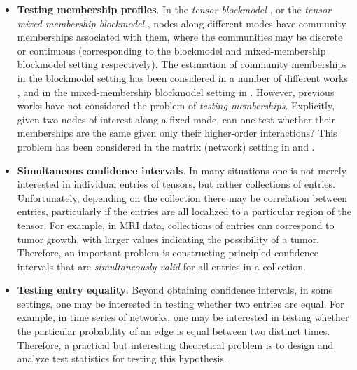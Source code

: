\documentclass[10pt]{article}
\newcommand{\0}{{\mathbf{0}}}
\newcommand{\1}{{\mathbf{1}}}
\renewcommand{\citet}{\cite}
\begin{document}
\begin{itemize}
    \item \textbf{Testing membership profiles}.  In the \emph{tensor blockmodel} \citep{wu_general_2016}, or the \emph{tensor mixed-membership blockmodel} \citep{agterberg_estimating_2022}, nodes along different modes have community memberships associated with them, where the communities may be discrete or continuous (corresponding to the blockmodel and mixed-membership blockmodel setting respectively).   The estimation of community memberships in the blockmodel setting has been considered in a number of different works \citep{han_exact_2020,chi_provable_2020,wang_multiway_2019}, and in the mixed-membership blockmodel setting in \citet{agterberg_estimating_2022}. However, previous works have not considered the problem of \emph{testing memberships}.  Explicitly, given two nodes of interest along a fixed mode, can one test whether their memberships are the same given only their higher-order interactions?  This problem has been considered in the matrix (network) setting in \citet{fan_simple_2022} and \citet{du_hypothesis_2022}. %
\item  \textbf{Simultaneous confidence intervals}. In many situations one is not merely interested in individual entries of tensors, but rather collections of entries.  Unfortunately, depending on the collection there may be correlation between entries, particularly if the entries are all localized to a particular region of the tensor.  For example, in MRI data, collections of entries can correspond to tumor growth, with larger values indicating the possibility of a tumor.  Therefore, an important problem is constructing principled confidence intervals that are  \emph{simultaneously valid} for all entries in a collection.
\item  \textbf{Testing  entry equality}.  Beyond obtaining confidence intervals, in some settings, one may be interested in testing whether two entries are equal. For example, in time series of networks, one may be interested in testing whether the particular probability of an edge is equal between two distinct times.  Therefore, a practical but interesting theoretical problem is to design and analyze test statistics for testing this  hypothesis.  
\end{itemize}
\end{document}
